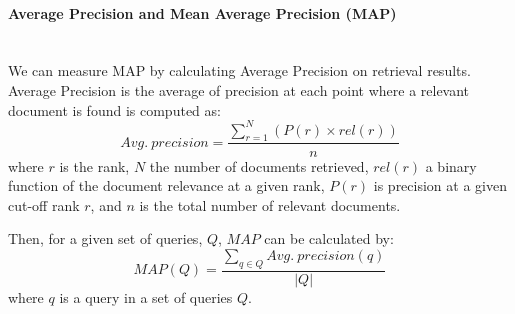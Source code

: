 \paragraph{Average Precision and Mean Average Precision (MAP) }
\ \\
We can measure MAP by calculating Average Precision on retrieval results. Average Precision is the average of precision at each point where a relevant document is found is computed as:
\begin{equation}
Avg. \: precision=\frac{\sum_{r=1}^{N}(P(r)\times rel(r))}{n}
\end{equation}
\noindent
where $ r $ is the rank, $ N $ the number of documents retrieved, $ rel(r) $ a binary function of the document relevance at a given rank, $ P(r) $ is precision at a given cut-off rank $ r $, and $ n $ is the total number of relevant documents.

Then, for a given set of queries, $ Q $, $ MAP $ can be calculated by:
\begin{equation}
MAP(Q)=\frac{\sum_{q\in Q}Avg. \: precision(q)}{|Q|}
\end{equation}
\noindent
where $ q $ is a query in a set of queries $ Q $.